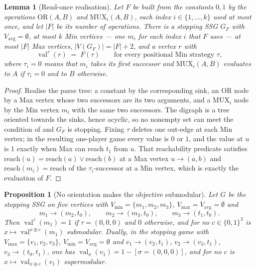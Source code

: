 \documentclass[11pt]{article}
\theoremstyle{plain}
\newtheorem{lemma}[theorem]{Lemma}
\newtheorem{proposition}[theorem]{Proposition}
\theoremstyle{definition}
\DeclareMathOperator{\val}{val}
\newcommand{\Vmax}{V_{\max}}
\newcommand{\Vmin}{V_{\min}}
\newcommand{\Vavg}{V_{\mathrm{avg}}}
\begin{document}
\begin{lemma}[Read-once realisation]\label{lem:readonce}
Let $F$ be built from the constants $0,1$ by the operations
$\mathrm{OR}(A,B)$ and $\mathrm{MUX}_i(A,B)$, each index $i\in\{1,\dots,k\}$
used at most once, and let $|F|$ be its number of operations. There is a
stopping SSG $G_F$ with $\Vavg=\emptyset$, at most $k$ Min vertices ---
one $m_i$ for each index $i$ that $F$ uses --- at most $|F|$ Max vertices, $|V(G_F)|=|F|+2$, and a vertex $r$
with
\[
  \val^{\tau}(r)\;=\;F(\tau)\qquad\text{for every positional Min strategy }\tau,
\]
where $\tau_i=0$ means that $m_i$ takes its first successor and
$\mathrm{MUX}_i(A,B)$ evaluates to $A$ if $\tau_i=0$ and to $B$ otherwise.
\end{lemma}

\begin{proof}
Realise the parse tree: a constant by the corresponding sink, an
$\mathrm{OR}$ node by a Max vertex whose two successors are its two arguments,
and a $\mathrm{MUX}_i$ node by the Min vertex $m_i$ with the same two
successors. The digraph is a tree oriented towards the sinks, hence acyclic, so
no nonempty set can meet the condition of  and $G_F$ is
stopping. Fixing $\tau$ deletes one out-edge at each Min vertex; in the
resulting one-player game every value is $0$ or $1$, and the value at $u$ is $1$
exactly when Max can reach $t_1$ from $u$. That reachability predicate satisfies
$\mathrm{reach}(u)=\mathrm{reach}(a)\vee\mathrm{reach}(b)$ at a Max vertex
$u\to(a,b)$ and $\mathrm{reach}(m_i)=\mathrm{reach}$ of the $\tau_i$-successor
at a Min vertex, which is exactly the evaluation of $F$.
\end{proof}

\begin{proposition}[No orientation makes the objective
submodular]\label{prop:no-submodular}
Let $G$ be the stopping SSG on five vertices with
$\Vmin=\{m_1,m_2,m_3\}$, $\Vmax=\Vavg=\emptyset$ and
\[
  m_1\to(m_2,t_0),\qquad m_2\to(m_3,t_0),\qquad m_3\to(t_1,t_0).
\]
Then $\val^{\tau}(m_1)=1$ if $\tau=(0,0,0)$ and $0$ otherwise, and for no
$c\in\{0,1\}^{3}$ is $x\mapsto\val^{x\oplus c}(m_1)$ submodular. Dually, in the
stopping game with $\Vmax=\{v_1,v_2,v_3\}$, $\Vmin=\Vavg=\emptyset$ and
$v_1\to(v_2,t_1)$, $v_2\to(v_3,t_1)$, $v_3\to(t_0,t_1)$, one has
$\val_{\sigma}(v_1)=1-[\sigma=(0,0,0)]$, and for no $c$ is
$x\mapsto\val_{x\oplus c}(v_1)$ supermodular.
\end{proposition}
\end{document}
